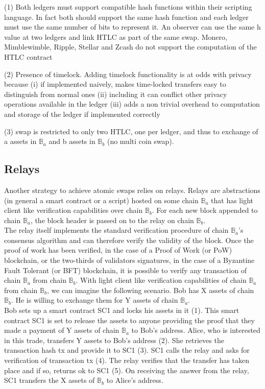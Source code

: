 \documentclass{article}      	%
\begin{document}
(1) Both ledgers must support compatible hash functions within their scripting language. In fact both should support the same hash function and each ledger must use the same number of bits to represent it. An observer can use the same h value at two ledgers and link HTLC as part of the same swap. Monero, Mimblewimble, Ripple, Stellar and Zcash do not support the computation of the HTLC contract

(2) Presence of timelock. Adding timelock functionality is at odds with privacy because (i) if implemented naively, makes time-locked transfers easy to distinguish from normal ones (ii) including it can conflict other privacy operations available in the ledger (iii) adds a non trivial overhead to computation and storage of the ledger if implemented correctly

(3) swap is restricted to only two HTLC, one per ledger, and thus to exchange of a assets in $\mathbb{B}_a$ and b assets in $\mathbb{B}_b$ (no multi coin swap).
\subsection{Relays}
Another strategy to achieve atomic swaps relies on relays. Relays are abstractions (in general a smart contract or a script) hosted on some
chain $\mathbb{B}_a$ that has light client like verification capabilities over chain $\mathbb{B}_b$. For each new block appended to chain $\mathbb{B}_a$,
the block header is passed on to the relay on chain $\mathbb{B}_b$. \\
The relay itself implements the standard verification procedure of chain $\mathbb{B}_a$’s consensus algorithm and can therefore verify the
validity of the block. Once the proof of work has been verified,
in the case of a Proof of Work (or PoW) blockchain, or the
two-thirds of validators signatures, in the case of a Byzantine
Fault Tolerant (or BFT) blockchain, it is possible to verify any
transaction of chain $\mathbb{B}_a$ from chain $\mathbb{B}_b$. With light client
like verification capabilities of chain $\mathbb{B}_a$ from chain $\mathbb{B}_b$,
we can imagine the following scenario. Bob has X assets of
chain $\mathbb{B}_b$. He is willing to exchange them for Y assets of
chain $\mathbb{B}_a$.  \\
    Bob sets up a smart contract SC1 and locks his
assets in it (1). This smart contract SC1 is set to release the
assets to anyone providing the proof that they made a payment
of Y assets of chain $\mathbb{B}_a$ to Bob’s address. Alice, who is
interested in this trade, transfers Y assets to Bob’s address (2).
She retrieves the transaction hash tx and provide it to SC1 (3).
SC1 calls the relay and asks for verification of transaction tx
(4). The relay verifies that the transfer has taken place and if
so, returns ok to SC1 (5). On receiving the answer from the
relay, SC1 transfers the X assets of $\mathbb{B}_b$ to Alice’s address.
\end{document}
